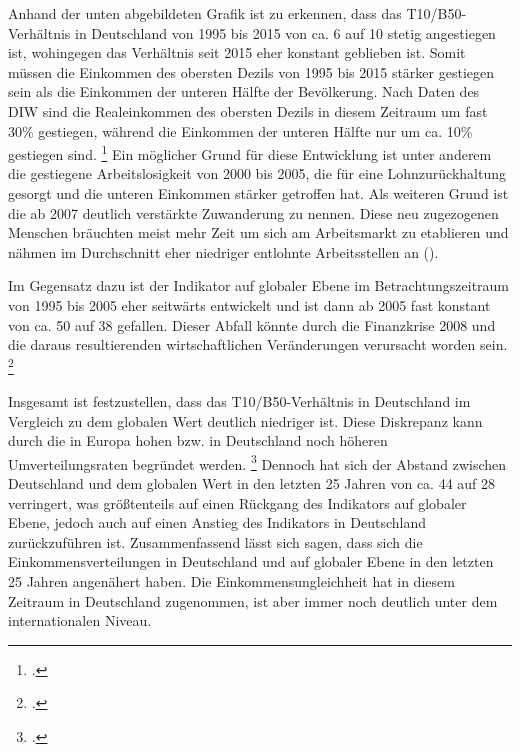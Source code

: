 Anhand der unten abgebildeten Grafik ist zu erkennen, dass das T10/B50-Verhältnis in Deutschland von 1995 bis 2015 von ca. 6 auf 10 stetig angestiegen ist, wohingegen das Verhältnis seit 2015 eher konstant geblieben ist. Somit müssen die Einkommen des obersten Dezils von 1995 bis 2015 stärker gestiegen sein als die Einkommen der unteren Hälfte der Bevölkerung. Nach Daten des DIW sind die Realeinkommen des obersten Dezils in diesem Zeitraum um fast 30\% gestiegen, während die Einkommen der unteren Hälfte nur um ca. 10\% gestiegen sind. \footcite[Vgl.][S. 452]{grabka_einkommensverteilung_2018} Ein möglicher Grund für diese Entwicklung ist unter anderem die gestiegene Arbeitslosigkeit von 2000 bis 2005, die für eine Lohnzurückhaltung gesorgt und die unteren Einkommen stärker getroffen hat. Als weiteren Grund ist die ab 2007 deutlich verstärkte Zuwanderung zu nennen. Diese neu zugezogenen Menschen bräuchten meist mehr Zeit um sich am Arbeitsmarkt zu etablieren und nähmen im Durchschnitt eher niedriger entlohnte Arbeitsstellen an (\cite[Vgl.][S.453]{grabka_einkommensverteilung_2018}). 

Im Gegensatz dazu ist der Indikator auf globaler Ebene im Betrachtungszeitraum von 1995 bis 2005 eher seitwärts entwickelt und ist dann ab 2005 fast konstant von ca. 50 auf 38 gefallen. Dieser Abfall könnte durch die Finanzkrise 2008 und die daraus resultierenden wirtschaftlichen Veränderungen verursacht worden sein. \footcite[Vgl.][S. 55]{wir_2022}

Insgesamt ist festzustellen, dass das T10/B50-Verhältnis in Deutschland im Vergleich zu dem globalen Wert deutlich niedriger ist. Diese Diskrepanz kann durch die in Europa hohen bzw. in Deutschland noch höheren Umverteilungsraten begründet werden. \footcite[Vgl.][S. 36f]{wir_2022} Dennoch hat sich der Abstand zwischen Deutschland und dem globalen Wert in den letzten 25 Jahren von ca. 44 auf 28 verringert, was grö{\ss}tenteils auf einen Rückgang des Indikators auf globaler Ebene, jedoch auch auf einen Anstieg des Indikators in Deutschland zurückzuführen ist. Zusammenfassend lässt sich sagen, dass sich die Einkommensverteilungen in Deutschland und auf globaler Ebene in den letzten 25 Jahren angenähert haben. Die Einkommensungleichheit hat in diesem Zeitraum in Deutschland zugenommen, ist aber immer noch deutlich unter dem internationalen Niveau.

